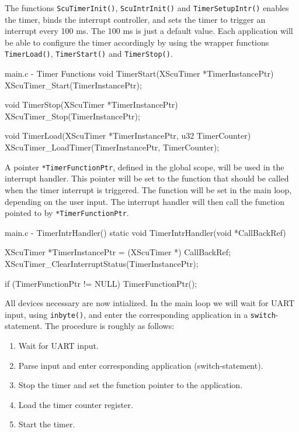 \documentclass[../main.tex]{subfiles}
\begin{document}
\newpage

The functions \texttt{ScuTimerInit()}, \texttt{ScuIntrInit()} and \texttt{TimerSetupIntr()} enables the timer, binds the interrupt controller, and sets the timer to trigger an interrupt every 100 ms. The 100 ms is just a default value. Each application will be able to configure the timer accordingly by using the wrapper functions \texttt{TimerLoad()}, \texttt{TimerStart()} and \texttt{TimerStop()}.

\begin{myminted}{main.c - Timer Functions}
void TimerStart(XScuTimer *TimerInstancePtr)
{
    XScuTimer_Start(TimerInstancePtr);
}

void TimerStop(XScuTimer *TimerInstancePtr)
{
    XScuTimer_Stop(TimerInstancePtr);
}

void TimerLoad(XScuTimer *TimerInstancePtr, u32 TimerCounter)
{
    XScuTimer_LoadTimer(TimerInstancePtr, TimerCounter);
}
\end{myminted}

A pointer \texttt{*TimerFunctionPtr}, defined in the global scope, will be used in the interrupt handler. This pointer will be set to the function that should be called when the timer interrupt is triggered. The function will be set in the main loop, depending on the user input. The interrupt handler will then call the function pointed to by \texttt{*TimerFunctionPtr}.

\begin{myminted}{main.c - TimerIntrHandler()}
static void TimerIntrHandler(void *CallBackRef)
{
    XScuTimer *TimerInstancePtr = (XScuTimer *) CallBackRef;
    XScuTimer_ClearInterruptStatus(TimerInstancePtr);

    if (TimerFunctionPtr != NULL) {
        TimerFunctionPtr();
    }
}
\end{myminted}

All devices necessary are now intialized. In the main loop we will wait for UART input, using \texttt{inbyte()}, and enter the corresponding application in a \texttt{switch}-statement. The procedure is roughly as follows:

\begin{enumerate}
    \item Wait for UART input.
    \item Parse input and enter corresponding application (switch-statement).
    \item Stop the timer and set the function pointer to the application.
    \item Load the timer counter register.
    \item Start the timer.
\end{enumerate}
\end{document}

